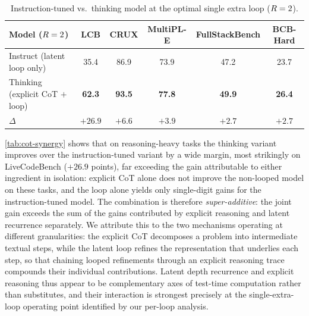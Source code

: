 \begin{table}[h]
\centering
\caption{Instruction-tuned vs.\ thinking model at the optimal single extra loop
($R = 2$).}
\label{tab:cot-synergy}
\begin{tabular}{lccccc}
\toprule
\textbf{Model ($R = 2$)} & LCB & CRUX & MultiPL-E & FullStackBench & BCB-Hard \\
\midrule
Instruct (latent loop only)        & 35.4 & 86.9 & 73.9 & 47.2 & 23.7 \\
Thinking (explicit CoT $+$ loop)   & \textbf{62.3} & \textbf{93.5} & \textbf{77.8} & \textbf{49.9} & \textbf{26.4} \\
\midrule
$\Delta$                           & $+26.9$ & $+6.6$ & $+3.9$ & $+2.7$ & $+2.7$ \\
\bottomrule
\end{tabular}
\end{table}

\autoref{tab:cot-synergy} shows that on reasoning-heavy tasks the thinking
variant improves over the instruction-tuned variant by a wide margin, most
strikingly on LiveCodeBench ($+26.9$ points), far exceeding the gain
attributable to either ingredient in isolation: explicit CoT alone does not
improve the non-looped model on these tasks, and the loop alone yields only
single-digit gains for the instruction-tuned model.
The combination is therefore \emph{super-additive}: the joint gain exceeds the
sum of the gains contributed by explicit reasoning and latent recurrence
separately.
We attribute this to the two mechanisms operating at different granularities:
the explicit CoT decomposes a problem into intermediate textual steps, while the
latent loop refines the representation that underlies each step, so that
chaining looped refinements through an explicit reasoning trace compounds their
individual contributions.
Latent depth recurrence and explicit reasoning thus appear to be complementary
axes of test-time computation rather than substitutes, and their interaction is
strongest precisely at the single-extra-loop operating point identified by our
per-loop analysis.
